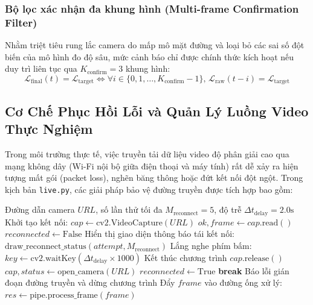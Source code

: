 \subsubsection{Bộ lọc xác nhận đa khung hình (Multi-frame Confirmation Filter)}
Nhằm triệt tiêu rung lắc camera do mấp mô mặt đường và loại bỏ các sai số đột biến của mô hình đo độ sâu, mức cảnh báo chỉ được chính thức kích hoạt nếu duy trì liên tục qua $K_{\text{confirm}} = 3$ khung hình:
\begin{equation}
\label{eq:confirm_frames}
\mathcal{L}_{\text{final}}(t) = \mathcal{L}_{\text{target}} \iff \forall i \in \{0, 1, \dots, K_{\text{confirm}} - 1\}, \, \mathcal{L}_{\text{raw}}(t - i) = \mathcal{L}_{\text{target}}
\end{equation}

\subsection{Cơ Chế Phục Hồi Lỗi và Quản Lý Luồng Video Thực Nghiệm}
\label{subsec:phuc_hoi_ket_noi}

Trong môi trường thực tế, việc truyền tải dữ liệu video độ phân giải cao qua mạng không dây (Wi-Fi nội bộ giữa điện thoại và máy tính) rất dễ xảy ra hiện tượng mất gói (packet loss), nghẽn băng thông hoặc đứt kết nối đột ngột. Trong kịch bản \texttt{live.py}, các giải pháp bảo vệ đường truyền được tích hợp bao gồm:

\begin{algorithm}[H]
\caption{Quy trình thu nhận khung hình và tự động khôi phục kết nối (Auto-Reconnect)}
\label{alg:auto_reconnect}
\begin{algorithmic}[1]
\REQUIRE Đường dẫn camera $URL$, số lần thử tối đa $M_{\text{reconnect}} = 5$, độ trễ $\Delta t_{\text{delay}} = 2.0\text{s}$
\STATE Khởi tạo kết nối: $cap \leftarrow \text{cv2.VideoCapture}(URL)$
    \STATE $ok, frame \leftarrow cap.\text{read}()$
        \STATE $reconnected \leftarrow \text{False}$
            \STATE Hiển thị giao diện thông báo tái kết nối: $\text{draw\_reconnect\_status}(attempt, M_{\text{reconnect}})$
            \STATE Lắng nghe phím bấm: $key \leftarrow \text{cv2.waitKey}(\Delta t_{\text{delay}} \times 1000)$
                \RETURN Kết thúc chương trình
            \ENDIF
            \STATE $cap.\text{release}()$
            \STATE $cap, status \leftarrow \text{open\_camera}(URL)$
                \STATE $reconnected \leftarrow \text{True}$
                \STATE \textbf{break}
            \ENDIF
        \ENDFOR
            \STATE Báo lỗi gián đoạn đường truyền và dừng chương trình
            \RETURN
        \ENDIF
    \ENDIF
    \STATE Đẩy $frame$ vào đường ống xử lý: $res \leftarrow \text{pipe.process\_frame}(frame)$
\ENDWHILE
\end{algorithmic}
\end{algorithm}

